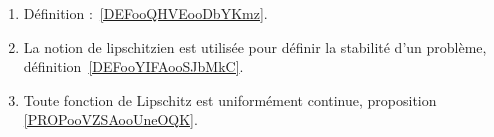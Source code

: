 
	\label{THEMEooFonctionsLipschitz}
\begin{enumerate}
	\item
	      Définition :~\ref{DEFooQHVEooDbYKmz}.
	\item
	      La notion de lipschitzien est utilisée pour définir la stabilité d'un problème, définition~\ref{DEFooYIFAooSJbMkC}.
      \item 
          Toute fonction de Lipschitz est uniformément continue, proposition \ref{PROPooVZSAooUneOQK}.
\end{enumerate}

